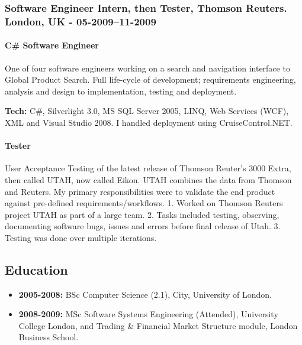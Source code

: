 \documentclass[
  a4paper,
  8pt,
]{article}
\providecommand{\tightlist}{%
  \setlength{\itemsep}{0pt}\setlength{\parskip}{0pt}}
\begin{document}
\begin{multicols}{2}
\hypertarget{software-engineer-intern-then-tester-thomson-reuters.-london-uk---05-200911-2009}{%
\subsubsection{Software Engineer Intern, then Tester, Thomson Reuters.
London, UK -
05-2009--11-2009}\label{software-engineer-intern-then-tester-thomson-reuters.-london-uk---05-200911-2009}}

\hypertarget{c-software-engineer}{%
\paragraph{C\# Software Engineer}\label{c-software-engineer}}

One of four software engineers working on a search and navigation
interface to Global Product Search. Full life-cycle of development;
requirements engineering, analysis and design to implementation, testing
and deployment.

\textbf{Tech:} C\#, Silverlight 3.0, MS SQL Server 2005, LINQ, Web
Services (WCF), XML and Visual Studio 2008. I handled deployment using
CruiseControl.NET.

\hypertarget{tester}{%
\paragraph{Tester}\label{tester}}

User Acceptance Testing of the latest release of Thomson Reuter's 3000
Extra, then called UTAH, now called Eikon. UTAH combines the data from
Thomson and Reuters. My primary responsibilities were to validate the
end product against pre-defined requirements/workflows. 1. Worked on
Thomson Reuters project UTAH as part of a large team. 2. Tasks included
testing, observing, documenting software bugs, issues and errors before
final release of Utah. 3. Testing was done over multiple iterations.

\hypertarget{education}{%
\subsection{Education}\label{education}}

\begin{itemize}
\tightlist
\item
  \textbf{2005-2008:} BSc Computer Science (2.1), City, University of
  London.
\item
  \textbf{2008-2009:} MSc Software Systems Engineering (Attended),
  University College London, and Trading \& Financial Market Structure
  module, London Business School.
\end{itemize}


\end{multicols}
\end{document}

